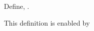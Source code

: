 \begin{definition}
  Define, \evdef.%
\end{definition}

\begin{justification}
  This definition is enabled by %
\end{justification}
